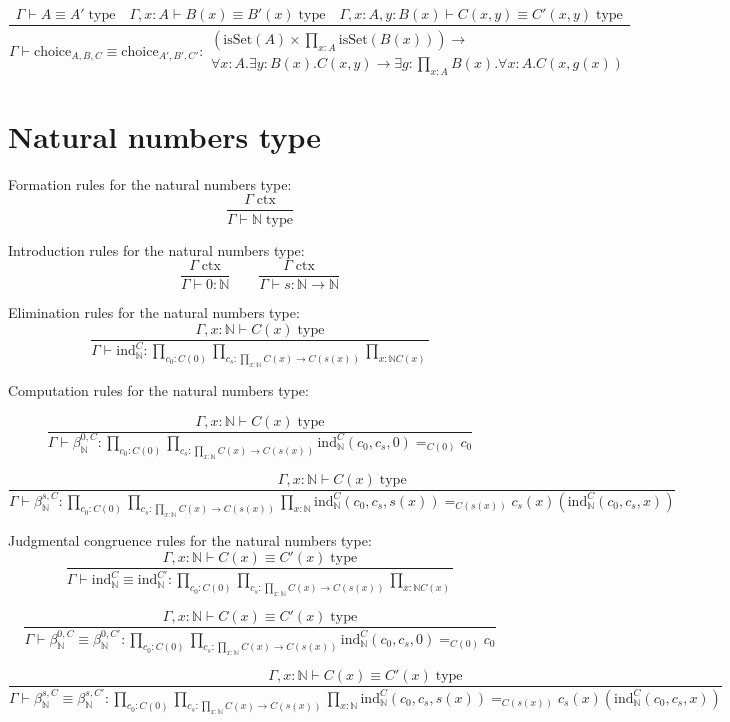 \documentclass{book}
\begin{document}
$$\frac{\Gamma \vdash A \equiv A' \; \mathrm{type} \quad \Gamma, x:A \vdash B(x) \equiv B'(x) \; \mathrm{type} \quad \Gamma, x:A, y:B(x) \vdash C(x, y) \equiv C'(x, y) \; \mathrm{type}}{\Gamma \vdash \mathrm{choice}_{A, B, C} \equiv \mathrm{choice}_{A', B', C'}:
\begin{array}{c}
\left(\mathrm{isSet}(A) \times \prod_{x:A} \mathrm{isSet}(B(x))\right) \to \\
\forall x:A.\exists y:B(x).C(x, y) \to \exists g:\prod_{x:A} B(x).\forall x:A.C(x, g(x))
\end{array}
}$$

\section{Natural numbers type}

Formation rules for the natural numbers type:
$$\frac{\Gamma \; \mathrm{ctx}}{\Gamma \vdash \mathbb{N} \; \mathrm{type}}$$

Introduction rules for the natural numbers type:
$$\frac{\Gamma \; \mathrm{ctx}}{\Gamma \vdash 0:\mathbb{N}} \qquad \frac{\Gamma \; \mathrm{ctx}}{\Gamma \vdash s:\mathbb{N} \to \mathbb{N}}$$

Elimination rules for the natural numbers type:
$$\frac{\Gamma, x:\mathbb{N} \vdash C(x) \; \mathrm{type}}{\Gamma \vdash \mathrm{ind}_\mathbb{N}^C:\prod_{c_0:C(0)} \prod_{c_s:\prod_{x:\mathbb{N}} C(x) \to C(s(x))} \prod_{x:\mathbb{N} C(x)}}$$

Computation rules for the natural numbers type:

$$\frac{\Gamma, x:\mathbb{N} \vdash C(x) \; \mathrm{type}}{\Gamma \vdash \beta_\mathbb{N}^{0, C}:\prod_{c_0:C(0)} \prod_{c_s:\prod_{x:\mathbb{N}} C(x) \to C(s(x))} \mathrm{ind}_\mathbb{N}^C(c_0, c_s, 0) =_{C(0)} c_0}$$

$$\frac{\Gamma, x:\mathbb{N} \vdash C(x) \; \mathrm{type}}{\Gamma \vdash \beta_\mathbb{N}^{s, C}:\prod_{c_0:C(0)} \prod_{c_s:\prod_{x:\mathbb{N}} C(x) \to C(s(x))} \prod_{x:\mathbb{N}} \mathrm{ind}_\mathbb{N}^C(c_0, c_s, s(x)) =_{C(s(x))} c_s(x)(\mathrm{ind}_\mathbb{N}^C(c_0, c_s, x))}$$

Judgmental congruence rules for the natural numbers type:
$$\frac{\Gamma, x:\mathbb{N} \vdash C(x) \equiv C'(x) \; \mathrm{type}}{\Gamma \vdash \mathrm{ind}_\mathbb{N}^C \equiv \mathrm{ind}_\mathbb{N}^{C'}:\prod_{c_0:C(0)} \prod_{c_s:\prod_{x:\mathbb{N}} C(x) \to C(s(x))} \prod_{x:\mathbb{N} C(x)}}$$

$$\frac{\Gamma, x:\mathbb{N} \vdash C(x) \equiv C'(x) \; \mathrm{type}}{\Gamma \vdash \beta_\mathbb{N}^{0, C} \equiv \beta_\mathbb{N}^{0, C'}:\prod_{c_0:C(0)} \prod_{c_s:\prod_{x:\mathbb{N}} C(x) \to C(s(x))} \mathrm{ind}_\mathbb{N}^C(c_0, c_s, 0) =_{C(0)} c_0}$$

$$\frac{\Gamma, x:\mathbb{N} \vdash C(x) \equiv C'(x) \; \mathrm{type}}{\Gamma \vdash \beta_\mathbb{N}^{s, C} \equiv \beta_\mathbb{N}^{s, C'}:\prod_{c_0:C(0)} \prod_{c_s:\prod_{x:\mathbb{N}} C(x) \to C(s(x))} \prod_{x:\mathbb{N}} \mathrm{ind}_\mathbb{N}^C(c_0, c_s, s(x)) =_{C(s(x))} c_s(x)(\mathrm{ind}_\mathbb{N}^C(c_0, c_s, x))}$$
\end{document}
